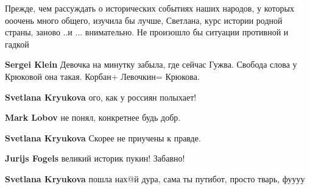 \begin{itemize}
\begin{itemize}
Прежде, чем рассуждать о исторических событиях наших народов, у которых ооочень
много общего, изучила бы лучше, Светлана, курс истории родной страны, заново
..и ... внимательно. Не произошло бы ситуации противной и гадкой

 
\textbf{Sergei Klein} Девочка на минутку забыла, где сейчас Гужва. Свобода слова у Крюковой она такая. Корбан+ Левочкин= Крюкова.

 
\textbf{Svetlana Kryukova} ого, как у россиян полыхает!

 
\textbf{Mark Lobov} не понял, конкретнее будь добр.

 
\textbf{Svetlana Kryukova} Скорее не приучены к правде.

 
\textbf{Jurijs Fogels} великий историк пукин! Забавно!

 
\textbf{Svetlana Kryukova} пошла нах@й дура, сама ты путибот, просто тварь, фуууу🤮

 

\end{itemize}
\end{itemize}
